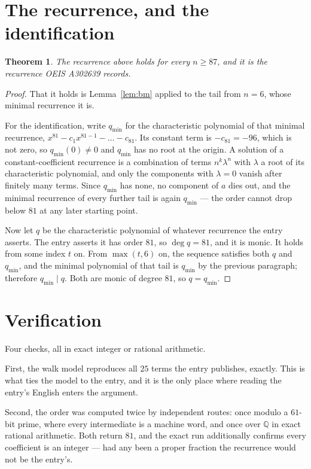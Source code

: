 \documentclass[11pt,a4paper]{article}
\theoremstyle{plain}
\newtheorem{theorem}{Theorem}
\theoremstyle{definition}
\begin{document}
\section{The recurrence, and the identification}

\begin{theorem}
The recurrence above holds for every $n\ge87$, and it is the recurrence OEIS A302639 records.
\end{theorem}

\begin{proof}
That it holds is Lemma~\ref{lem:bm} applied to the tail from $n=6$, whose minimal
recurrence it is.

For the identification, write $q_{\min}$ for the characteristic polynomial of that minimal
recurrence, $x^{81}-c_1x^{81-1}-\dots-c_{81}$. Its constant term is
$-c_{81}=-96$, which is not zero, so $q_{\min}(0)\neq0$ and $q_{\min}$ has no
root at the origin. A solution of a constant-coefficient recurrence is a combination of terms
$n^{k}\lambda^{n}$ with $\lambda$ a root of its characteristic polynomial, and only the
components with $\lambda=0$ vanish after finitely many terms. Since $q_{\min}$ has none, no
component of $a$ dies out, and the minimal recurrence of every further tail is again
$q_{\min}$ --- the order cannot drop below $81$ at any later starting point.

Now let $q$ be the characteristic polynomial of whatever recurrence the entry asserts. The
entry asserts it has order $81$, so $\deg q=81$, and it is monic. It holds from some
index $t$ on. From $\max(t,6)$ on, the sequence satisfies both $q$ and $q_{\min}$, and
the minimal polynomial of that tail is $q_{\min}$ by the previous paragraph; therefore
$q_{\min}\mid q$. Both are monic of degree $81$, so $q=q_{\min}$.
\end{proof}

\section{Verification}

Four checks, all in exact integer or rational arithmetic.

First, the walk model reproduces all $25$ terms the entry publishes, exactly. This is
what ties the model to the entry, and it is the only place where reading the entry's English
enters the argument.

Second, the order was computed twice by independent routes: once modulo a $61$-bit prime, where
every intermediate is a machine word, and once over $\mathbb{Q}$ in exact rational arithmetic.
Both return $81$, and the exact run additionally confirms every coefficient is an integer
--- had any been a proper fraction the recurrence would not be the entry's.
\end{document}
